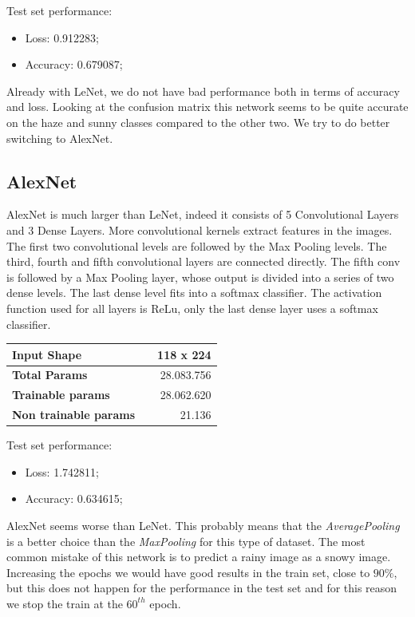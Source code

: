 \documentclass[12pt]{article}
\begin{document}
\clearpage
Test set performance:
\begin{itemize}
 \item Loss: 0.912283;
 \item Accuracy: 0.679087;
\end{itemize}
Already with LeNet, we do not have bad performance both in terms of accuracy and loss. Looking at the confusion matrix this network seems to be quite accurate on the haze and sunny classes compared to the other two. We try to do better switching to AlexNet.

\subsection{AlexNet}
AlexNet is much larger than LeNet, indeed it consists of 5 Convolutional Layers and 3 Dense Layers. More convolutional kernels extract features in the images.
The first two convolutional levels are followed by the Max Pooling levels. The third, fourth and fifth convolutional layers are connected directly. The fifth conv is followed by a Max Pooling layer, whose output is divided into a series of two dense levels. The last dense level fits into a softmax classifier. The activation function used for all layers is ReLu, only the last dense layer uses a softmax classifier.

\bigskip
\begin{tabular}{|ll|r|}
 \hline
 {\bf Input Shape} & & 118 x 224 \\ \hline
 {\bf Total Params} & & 28.083.756 \\ \hline
 {\bf Trainable params} & & 28.062.620 \\ \hline
 {\bf Non trainable params} & & 21.136 \\ \hline
\end{tabular}

\bigskip
Test set performance:
\begin{itemize}
 \item Loss: 1.742811;
 \item Accuracy: 0.634615;
\end{itemize}

AlexNet seems worse than LeNet. This probably means that the {\em AveragePooling} is a better choice than the {\em MaxPooling} for this type of dataset. The most common mistake of this network is to predict a rainy image as a snowy image. Increasing the epochs we would have good results in the train set, close to $90\%$, but this does not happen for the performance in the test set and for this reason we stop the train at the $60^{th}$ epoch.
\end{document}
